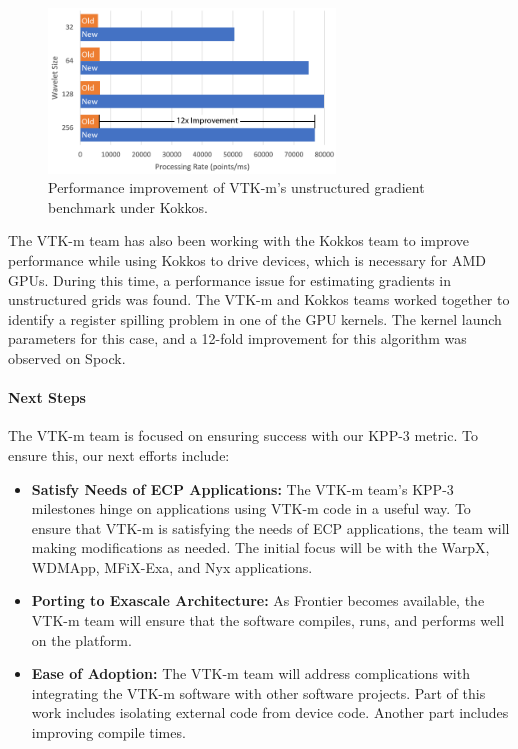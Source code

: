 \begin{figure}[ht]
  \centering
  \includegraphics[width=3in]{projects/2.3.4-DataViz/2.3.4.13-ECP-VTK-m/VTKm-spock-timing.png}
  \caption{Performance improvement of VTK-m's unstructured gradient benchmark under Kokkos.}
  \label{fig:VTKmPerf}
\end{figure}

The VTK-m team has also been working with the Kokkos team to improve performance while using Kokkos to drive devices, which is necessary for AMD GPUs.
During this time, a performance issue for estimating gradients in unstructured grids was found.
The VTK-m and Kokkos teams worked together to identify a register spilling problem in one of the GPU kernels.
The kernel launch parameters for this case, and a 12-fold improvement for this algorithm was observed on Spock.

\paragraph{Next Steps}
The VTK-m team is focused on ensuring success with our KPP-3 metric.
To ensure this, our next efforts include:

\begin{itemize}
\item \textbf{Satisfy Needs of ECP Applications:}
  The VTK-m team's KPP-3 milestones hinge on applications using VTK-m code in a useful way.
  To ensure that VTK-m is satisfying the needs of ECP applications, the team will making modifications as needed.
  The initial focus will be with the WarpX, WDMApp, MFiX-Exa, and Nyx applications.
\item \textbf{Porting to Exascale Architecture:}
  As Frontier becomes available, the VTK-m team will ensure that the software compiles, runs, and performs well on the platform.
\item \textbf{Ease of Adoption:}
  The VTK-m team will address complications with integrating the VTK-m software with other software projects.
  Part of this work includes isolating external code from device code.
  Another part includes improving compile times.
\end{itemize}
